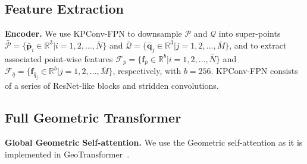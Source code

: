 \subsection{Feature Extraction}
\noindent\textbf{Encoder.}
We use KPConv-FPN \cite{thomas2019kpconv} to downsample $\bm{\mathcal{P}}$ and $\bm{\mathcal{Q}}$ into super-points $\bar{\bm{\mathcal{P}}}=\{\bar{\bm{p}}_i \in\mathbb{R}^{3}|i = 1, 2, ..., \bar{N}\}$ and $\bar{\bm{\mathcal{Q}}}=\{\bar{\bm{q}}_j \in\mathbb{R}^{3}|j = 1, 2, ..., \bar{M}\}$, and to extract associated point-wise features $\bm{\mathcal{F}}_{\bar{p}}=\{\bm{f}_{\bar{p}} \in\mathbb{R}^{b}|i = 1, 2, ..., \bar{N}\}$ and $\bm{\mathcal{F}}_{\bar{q}}=\{\bm{f}_{\bar{q}_j} \in\mathbb{R}^{b}|j = 1, 2, ..., \bar{M}\}$, respectively, with $b=256$.
KPConv-FPN consists of a series of ResNet-like blocks and stridden convolutions.


\vspace{-2mm}

\subsection{Full Geometric Transformer} 


\noindent\textbf{Global Geometric Self-attention.}
We use the Geometric self-attention as it is implemented in GeoTransformer~\cite{qin2022geometric}.





